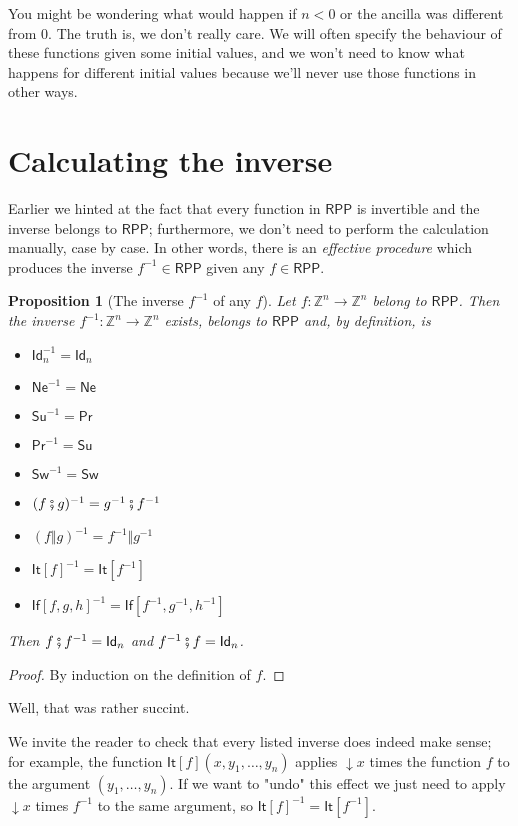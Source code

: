 \documentclass{book}
\theoremstyle{definition}
\theoremstyle{remark}
\theoremstyle{plain}
\newtheorem{proposition}{Proposition}
\newcommand{\Z}{\mathbb{Z}}
\newcommand{\RPP}{\mathsf{RPP}}
\newcommand{\rppId}{\mathsf{Id}}
\newcommand{\rppNe}{\mathsf{Ne}}
\newcommand{\rppSu}{\mathsf{Su}}
\newcommand{\rppPr}{\mathsf{Pr}}
\newcommand{\rppSw}{\mathsf{Sw}}
\newcommand{\rppCo}{\fatsemi}
\newcommand{\rppPa}{\Vert}
\newcommand{\rppIt}[1]{\mathsf{It}[#1]}
\newcommand{\rppIf}[3]{\mathsf{If}[#1, #2, #3]}
\begin{document}
You might be wondering what would happen if $n < 0$ or the ancilla was different from $0$.
The truth is, we don't really care.
We will often specify the behaviour of these functions given some initial values,
and we won't need to know what happens for different initial values because we'll never use those functions in other ways.

\section{Calculating the inverse}

Earlier we hinted at the fact that every function in $\RPP$ is invertible and the inverse belongs to $\RPP$;
furthermore, we don't need to perform the calculation manually, case by case.
In other words, there is an \textit{effective procedure} which produces the inverse $f^{-1} \in \RPP$ given any $f \in \RPP$.

\begin{proposition}[The inverse $f^{-1}$ of any $f$]
Let $f : \Z^n \to \Z^n$ belong to $\RPP$.
Then the inverse $f^{-1} : \Z^n \to \Z^n$ exists, belongs to $\RPP$ and, by definition, is
\begin{itemize}
\item $\rppId_n^{-1} = \rppId_n$
\item $\rppNe^{-1} = \rppNe$
\item $\rppSu^{-1} = \rppPr$
\item $\rppPr^{-1} = \rppSu$
\item $\rppSw^{-1} = \rppSw$
\item $(f \rppCo g)^{-1} = g^{-1} \rppCo f^{-1}$
\item $(f \rppPa g)^{-1} = f^{-1} \rppPa g^{-1}$
\item ${\rppIt f}^{-1} = \rppIt {f^{-1}}$
\item ${\rppIf f g h}^{-1} = \rppIf {f^{-1}} {g^{-1}} {h^{-1}}$
\end{itemize}
Then $f \rppCo f^{-1} = \rppId_n$ and $f^{-1} \rppCo f = \rppId_n$.
\end{proposition}
\begin{proof}
By induction on the definition of $f$.
\end{proof}

Well, that was rather succint.

We invite the reader to check that every listed inverse does indeed make sense;
for example, the function $\rppIt f (x, y_1, \dots, y_n)$ applies $\downarrow x$ times the function $f$ to the argument $(y_1, \dots, y_n)$.
If we want to "undo" this effect we just need to apply $\downarrow x$ times $f^{-1}$ to the same argument, so
${\rppIt f}^{-1} = \rppIt {f^{-1}}$.
\end{document}
